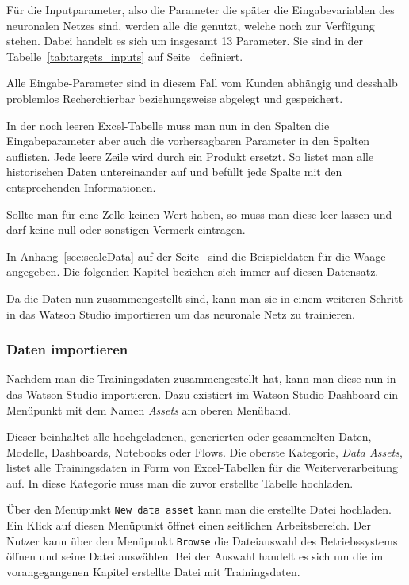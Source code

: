 Für die Inputparameter, also die Parameter die später die Eingabevariablen des neuronalen Netzes sind, werden alle die
genutzt, welche noch zur Verfügung stehen. Dabei handelt es sich um insgesamt 13 Parameter. Sie sind in der
Tabelle~\ref{tab:targets_inputs} auf Seite~\pageref{tab:targets_inputs} definiert.

Alle Eingabe-Parameter sind in diesem Fall vom Kunden abhängig und desshalb problemlos Recherchierbar beziehungsweise
abgelegt und gespeichert.

In der noch leeren Excel-Tabelle muss man nun in den Spalten die Eingabeparameter aber auch die vorhersagbaren Parameter
in den Spalten auflisten. Jede leere Zeile wird durch ein Produkt ersetzt. So listet man alle historischen Daten
untereinander auf und befüllt jede Spalte mit den entsprechenden Informationen.

Sollte man für eine Zelle keinen Wert haben, so muss man diese leer lassen und darf keine null oder sonstigen Vermerk
eintragen.

In Anhang~\ref{sec:scaleData} auf der Seite~\pageref{sec:scaleData} sind die Beispieldaten für die Waage angegeben. Die
folgenden Kapitel beziehen sich immer auf diesen Datensatz.

Da die Daten nun zusammengestellt sind, kann man sie in einem weiteren Schritt in das Watson Studio importieren um das
neuronale Netz zu trainieren.


\subsubsection{Daten importieren}
Nachdem man die Trainingsdaten zusammengestellt hat, kann man diese nun in das Watson Studio importieren. Dazu existiert
im Watson Studio Dashboard ein Menüpunkt mit dem Namen \textit{Assets} am oberen Menüband.

Dieser beinhaltet alle hochgeladenen, generierten oder gesammelten Daten, Modelle, Dashboards, Notebooks oder Flows. Die
oberste Kategorie, \textit{Data Assets}, listet alle Trainingsdaten in Form von Excel-Tabellen für die Weiterverarbeitung
auf. In diese Kategorie muss man die zuvor erstellte Tabelle hochladen.

Über den Menüpunkt \texttt{New data asset} kann man die erstellte Datei hochladen. Ein Klick auf diesen Menüpunkt öffnet
einen seitlichen Arbeitsbereich. Der Nutzer kann über den Menüpunkt \texttt{Browse} die Dateiauswahl des Betriebssystems
öffnen und seine Datei auswählen. Bei der Auswahl handelt es sich um die im vorangegangenen Kapitel erstellte Datei mit
Trainingsdaten.


